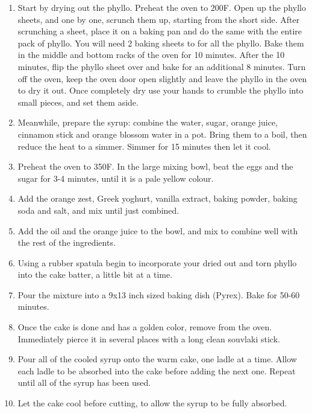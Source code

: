 \begin{enumerate}
    \item Start by drying out the phyllo. Preheat the oven to 200\degree F. Open up the phyllo sheets, and one by one, scrunch them up, starting from the short side. After scrunching a sheet, place it on a baking pan and do the same with the entire pack of phyllo. You will need 2 baking sheets to for all the phyllo. Bake them in the middle and bottom racks of the oven for 10 minutes. After the 10 minutes, flip the phyllo sheet over and bake for an additional 8 minutes. Turn off the oven, keep the oven door open slightly and leave the phyllo in the oven to dry it out. Once completely dry use your hands to crumble the phyllo into small pieces, and set them aside.
    \item Meanwhile, prepare the syrup: combine the water, sugar, orange juice, cinnamon stick and orange blossom water in a pot. Bring them to a boil, then reduce the heat to a simmer. Simmer for 15 minutes then let it cool.
    \item Preheat the oven to 350\degree F. In the large mixing bowl, beat the eggs and the sugar for 3-4 minutes, until it is a pale yellow colour.
    \item Add the orange zest, Greek yoghurt, vanilla extract, baking powder, baking soda and salt, and mix until just combined.
    \item Add the oil and the orange juice to the bowl, and mix to combine well with the rest of the ingredients.
    \item Using a rubber spatula begin to incorporate your dried out and torn phyllo into the cake batter, a little bit at a time.
    \item Pour the mixture into a 9x13 inch sized baking dish (Pyrex). Bake for 50-60 minutes.
    \item Once the cake is done and has a golden color, remove from the oven. Immediately pierce it in several places with a long clean souvlaki stick. \item Pour all of the cooled syrup onto the warm cake, one ladle at a time. Allow each ladle to be absorbed into the cake before adding the next one. Repeat until all of the syrup has been used.
    \item Let the cake cool before cutting, to allow the syrup to be fully absorbed.
\end{enumerate}

